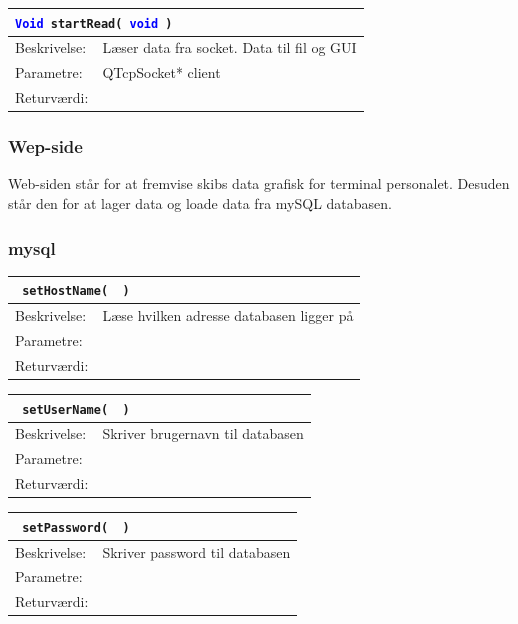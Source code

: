 \begin{table}[H]
\begin{tabular}{l p{12.5cm}}
\multicolumn{2}{l}{\texttt{\textcolor{blue}{Void} startRead( \textcolor{blue}{void} )}} \\
\hline
Beskrivelse:&Læser data fra socket. Data til fil og GUI\\
Parametre:&QTcpSocket* client\\
Returværdi:&\\
\end{tabular}
\end{table}

\subsubsection{Wep-side}
Web-siden står for at fremvise skibs data grafisk for terminal personalet. Desuden står den for at lager data og loade data fra mySQL databasen.\\
\subsubsection{mysql}
\begin{table}[H]
\begin{tabular}{l p{12.5cm}}
\multicolumn{2}{l}{\texttt{\textcolor{blue}{} setHostName( \textcolor{blue}{} )}} \\
\hline
Beskrivelse:&Læse hvilken adresse databasen ligger på\\
Parametre:&\\
Returværdi:&\\
\end{tabular}
\end{table}

\begin{table}[H]
\begin{tabular}{l p{12.5cm}}
\multicolumn{2}{l}{\texttt{\textcolor{blue}{} setUserName( \textcolor{blue}{} )}} \\
\hline
Beskrivelse:&Skriver brugernavn til databasen\\
Parametre:&\\
Returværdi:&\\
\end{tabular}
\end{table}

\begin{table}[H]
\begin{tabular}{l p{12.5cm}}
\multicolumn{2}{l}{\texttt{\textcolor{blue}{} setPassword( \textcolor{blue}{} )}} \\
\hline
Beskrivelse:&Skriver password til databasen\\
Parametre:&\\
Returværdi:&\\
\end{tabular}
\end{table}

